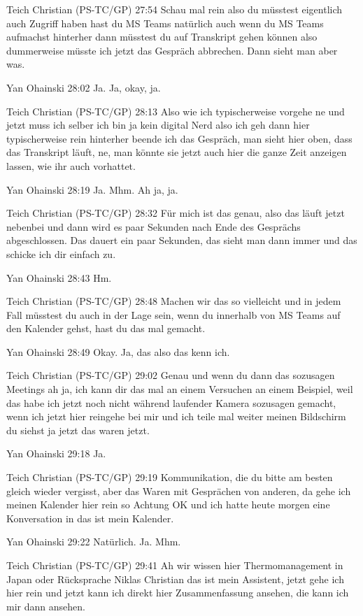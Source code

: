 Teich Christian (PS-TC/GP)   27:54
Schau mal rein also du müsstest eigentlich auch Zugriff haben hast du MS Teams natürlich auch wenn du MS Teams aufmachst hinterher dann müsstest du auf Transkript gehen können also dummerweise müsste ich jetzt das Gespräch abbrechen. Dann sieht man aber was.

Yan Ohainski   28:02
Ja.
Ja, okay, ja.

Teich Christian (PS-TC/GP)   28:13
Also wie ich typischerweise vorgehe ne und jetzt muss ich selber ich bin ja kein digital Nerd also ich geh dann hier typischerweise rein hinterher beende ich das Gespräch, man sieht hier oben, dass das Transkript läuft, ne, man könnte sie jetzt auch hier die ganze Zeit anzeigen lassen, wie ihr auch vorhattet.

Yan Ohainski   28:19
Ja.
Mhm.
Ah ja, ja.

Teich Christian (PS-TC/GP)   28:32
Für mich ist das genau, also das läuft jetzt nebenbei und dann wird es paar Sekunden nach Ende des Gesprächs abgeschlossen. Das dauert ein paar Sekunden, das sieht man dann immer und das schicke ich dir einfach zu.

Yan Ohainski   28:43
Hm.

Teich Christian (PS-TC/GP)   28:48
Machen wir das so vielleicht und in jedem Fall müsstest du auch in der Lage sein, wenn du innerhalb von MS Teams auf den Kalender gehst, hast du das mal gemacht.

Yan Ohainski   28:49
Okay.
Ja, das also das kenn ich.

Teich Christian (PS-TC/GP)   29:02
Genau und wenn du dann das sozusagen Meetings ah ja, ich kann dir das mal an einem Versuchen an einem Beispiel, weil das habe ich jetzt noch nicht während laufender Kamera sozusagen gemacht, wenn ich jetzt hier reingehe bei mir und ich teile mal weiter meinen Bildschirm du siehst ja jetzt das waren jetzt.

Yan Ohainski   29:18
Ja.

Teich Christian (PS-TC/GP)   29:19
Kommunikation, die du bitte am besten gleich wieder vergisst, aber das Waren mit Gesprächen von anderen, da gehe ich meinen Kalender hier rein so Achtung OK und ich hatte heute morgen eine Konversation in das ist mein Kalender.

Yan Ohainski   29:22
Natürlich.
Ja.
Mhm.

Teich Christian (PS-TC/GP)   29:41
Ah wir wissen hier Thermomanagement in Japan oder Rücksprache Niklas Christian das ist mein Assistent, jetzt gehe ich hier rein und jetzt kann ich direkt hier Zusammenfassung ansehen, die kann ich mir dann ansehen.


